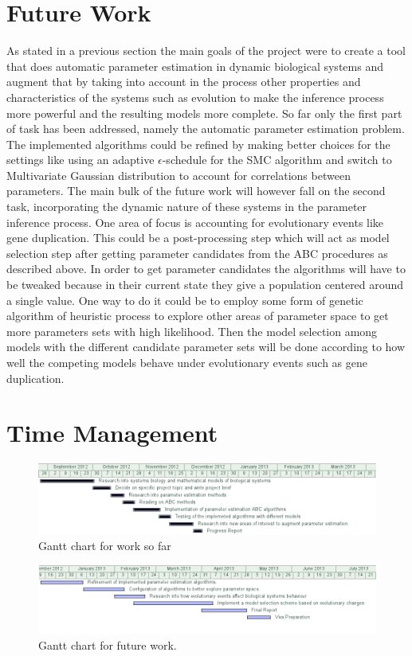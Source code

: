 \documentclass[12pt,a4paper,titlepage]{article}
\begin{document}
\section{Future Work}
As stated in a previous section the main goals of the project were to create a tool that does automatic parameter estimation in dynamic biological systems and augment that by taking into account in the process other properties and characteristics of the systems such as evolution to make the inference process more powerful and the resulting models more complete. So far only the first part of task has been addressed, namely the automatic parameter estimation problem. The implemented algorithms could be refined by making better choices for the settings like using an adaptive $\epsilon$-schedule for the SMC algorithm and switch to Multivariate Gaussian distribution to account for correlations between parameters. The main bulk of the future work will however fall on the second task, incorporating the dynamic nature of these systems in the parameter inference process. One area of focus is accounting for evolutionary events like gene duplication. This could be a post-processing step which will act as model selection step after getting parameter candidates from the ABC procedures as described above. In order to get parameter candidates the algorithms will have to be tweaked because in their current state they give a population centered around a single value. One way to do it could be to employ some form of genetic algorithm of heuristic process to explore other areas of parameter space to get more parameters sets with high  likelihood. Then the model selection among models with the different candidate parameter sets will be done according to how well the competing models behave under evolutionary events such as gene duplication.
\newpage

\appendix
\section{Time Management}
\begin{figure}[H]
\centering
\includegraphics[scale=0.5]{gantt1}
\caption{Gantt chart for work so far}
\end{figure}
\begin{figure}[H]
\centering
\includegraphics[scale=0.5]{gantt2}
\caption{Gantt chart for future work.}
\end{figure}
\end{document}
